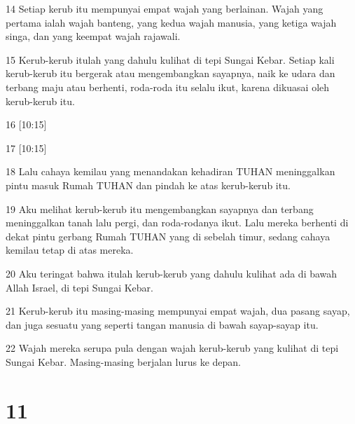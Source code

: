 \par 14 Setiap kerub itu mempunyai empat wajah yang berlainan. Wajah yang pertama ialah wajah banteng, yang kedua wajah manusia, yang ketiga wajah singa, dan yang keempat wajah rajawali.
\par 15 Kerub-kerub itulah yang dahulu kulihat di tepi Sungai Kebar. Setiap kali kerub-kerub itu bergerak atau mengembangkan sayapnya, naik ke udara dan terbang maju atau berhenti, roda-roda itu selalu ikut, karena dikuasai oleh kerub-kerub itu.
\par 16 [10:15]
\par 17 [10:15]
\par 18 Lalu cahaya kemilau yang menandakan kehadiran TUHAN meninggalkan pintu masuk Rumah TUHAN dan pindah ke atas kerub-kerub itu.
\par 19 Aku melihat kerub-kerub itu mengembangkan sayapnya dan terbang meninggalkan tanah lalu pergi, dan roda-rodanya ikut. Lalu mereka berhenti di dekat pintu gerbang Rumah TUHAN yang di sebelah timur, sedang cahaya kemilau tetap di atas mereka.
\par 20 Aku teringat bahwa itulah kerub-kerub yang dahulu kulihat ada di bawah Allah Israel, di tepi Sungai Kebar.
\par 21 Kerub-kerub itu masing-masing mempunyai empat wajah, dua pasang sayap, dan juga sesuatu yang seperti tangan manusia di bawah sayap-sayap itu.
\par 22 Wajah mereka serupa pula dengan wajah kerub-kerub yang kulihat di tepi Sungai Kebar. Masing-masing berjalan lurus ke depan.

\chapter{11}

